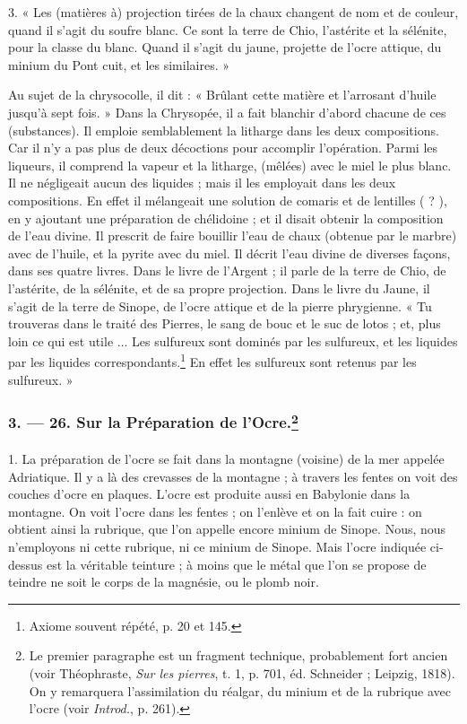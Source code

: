 \documentclass[landscape, a4paper, 11pt, oneside, polutonikogreek, french]{article}
\begin{document}
3. « Les (matières à) projection tirées de la chaux changent de nom et de couleur, quand il s'agit du soufre blanc. Ce sont la terre de Chio, l'astérite et la sélénite, pour la classe du blanc. Quand il s'agit du jaune, projette de l'ocre attique, du minium du Pont cuit, et les similaires. »

Au sujet de la chrysocolle, il dit : « Brûlant cette matière et l'arrosant d'huile jusqu'à sept fois. » Dans la Chrysopée, il a fait blanchir d'abord chacune de ces (substances). Il emploie semblablement la litharge dans les deux compositions. Car il n'y a pas plus de deux décoctions pour accomplir l'opération. Parmi les liqueurs, il comprend la vapeur et la litharge, (mêlées) avec le miel le plus blanc. Il ne négligeait aucun des liquides ; mais il les employait dans les deux compositions. En effet il mélangeait une solution de comaris et de lentilles ( ? ), en y ajoutant une préparation de chélidoine ; et il disait obtenir la composition de l'eau divine. Il prescrit de faire bouillir l'eau de chaux (obtenue par le marbre) avec de l'huile, et la pyrite avec du miel. Il décrit l'eau divine de diverses façons, dans ses quatre livres. Dans le livre de l'Argent ; il parle de la terre de Chio, de l'astérite, de la sélénite, et de sa propre projection. Dans le livre du Jaune, il s'agit de la terre de Sinope, de l'ocre attique et de la pierre phrygienne. « Tu trouveras dans le traité des Pierres, le sang de bouc et le suc de lotos ; et, plus loin ce qui est utile ... Les sulfureux sont dominés par les sulfureux, et les liquides par les liquides correspondants.\footnote{Axiome souvent répété, p. 20 et 145.} En effet les sulfureux sont retenus par les sulfureux. »

\bigskip
\centerline{\EightStarTaper}
\centerline{\EightStarTaper\EightStarTaper}
\bigskip

\subsubsection[3. --- 26. Sur la Préparation de l'Ocre.]{3. --- 26. Sur la Préparation de l'Ocre.\footnote{Le premier paragraphe est un fragment technique, probablement fort ancien (voir Théophraste, \emph{Sur les pierres}, t. 1, p. 701, éd. Schneider ; Leipzig, 1818). On y remarquera l'assimilation du réalgar, du minium et de la rubrique avec l'ocre (voir \emph{Introd.}, p. 261).}}
\paragraph{}
1. La préparation de l'ocre se fait dans la montagne (voisine) de la mer appelée Adriatique. Il y a là des crevasses de la montagne ; à travers les fentes on voit des couches d'ocre en plaques. L'ocre est produite aussi en Babylonie dans la montagne. On voit l'ocre dans les fentes ; on l'enlève et on la fait cuire : on obtient ainsi la rubrique, que l'on appelle encore minium de Sinope. Nous, nous n'employons ni cette rubrique, ni ce minium de Sinope. Mais l'ocre indiquée ci-dessus est la véritable teinture ; à moins que le métal que l'on se propose de teindre ne soit le corps de la magnésie, ou le plomb noir.
\end{document}
